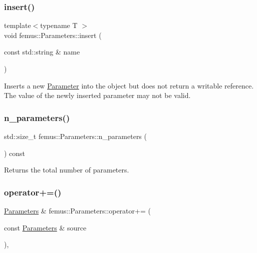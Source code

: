 \subsubsection{\texorpdfstring{insert()}{insert()}}
{\footnotesize\ttfamily template$<$typename T $>$ \\
void femus\+::\+Parameters\+::insert (\begin{DoxyParamCaption}\item[{const std\+::string \&}]{name }\end{DoxyParamCaption})\hspace{0.3cm}{\ttfamily [inline]}}

Inserts a new \mbox{\hyperlink{classfemus_1_1_parameters_1_1_parameter}{Parameter}} into the object but does not return a writable reference. The value of the newly inserted parameter may not be valid. \mbox{\label{classfemus_1_1_parameters_a78c60e3056c0f0d6954b4666a95aea25}} 
\subsubsection{\texorpdfstring{n\+\_\+parameters()}{n\_parameters()}}
{\footnotesize\ttfamily std\+::size\+\_\+t femus\+::\+Parameters\+::n\+\_\+parameters (\begin{DoxyParamCaption}{ }\end{DoxyParamCaption}) const\hspace{0.3cm}{\ttfamily [inline]}}

\begin{DoxyReturn}{Returns}
the total number of parameters. 
\end{DoxyReturn}
\mbox{\label{classfemus_1_1_parameters_af7122cef76beb027360f3683fae5acd6}} 
\subsubsection{\texorpdfstring{operator+=()}{operator+=()}}
{\footnotesize\ttfamily \mbox{\hyperlink{classfemus_1_1_parameters}{Parameters}} \& femus\+::\+Parameters\+::operator+= (\begin{DoxyParamCaption}\item[{const \mbox{\hyperlink{classfemus_1_1_parameters}{Parameters}} \&}]{source }\end{DoxyParamCaption})\hspace{0.3cm}{\ttfamily [inline]}, {\ttfamily [virtual]}}


